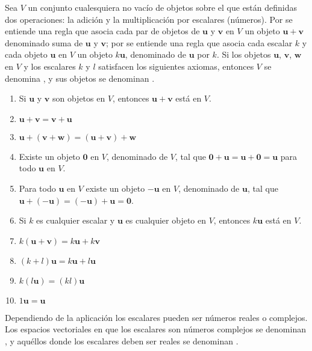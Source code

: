\documentclass[a4paper,12pt]{article}
\begin{document}
\begin{concept}
  Sea $V$ un conjunto cualesquiera no vacío de objetos sobre el que están
  definidas dos operaciones: la adición y la multiplicación por escalares
  (números). Por  se entiende una regla que asocia cada par de
  objetos de $\mathbf{u}$ y $\mathbf{v}$ en $V$ un objeto
  $\mathbf{u}+\mathbf{v}$ denominado suma de $\mathbf{u}$ y $\mathbf{v}$; por
   se entiende una regla que asocia cada escalar
  $k$ y cada objeto $\mathbf{u}$ en $V$ un objeto $k\mathbf{u}$, denominado
   de $\mathbf{u}$ por $k$. Si los objetos $\mathbf{u}$,
  $\mathbf{v}$, $\mathbf{w}$ en $V$ y los escalares $k$ y $l$ satisfacen los
  siguientes axiomas, entonces $V$ se denomina , y sus
  objetos se denominan .
  \begin{enumerate}[(1)]
    \item Si $\mathbf{u}$ y $\mathbf{v}$ son objetos en $V$, entonces
      $\mathbf{u}+\mathbf{v}$ está en $V$.
    \item $\mathbf{u}+\mathbf{v}=\mathbf{v}+\mathbf{u}$
    \item
      $\mathbf{u}+(\mathbf{v}+\mathbf{w})=(\mathbf{u}+\mathbf{v})+\mathbf{w}$
    \item Existe un objeto $\mathbf{0}$ en $V$, denominado  de
      $V$, tal que $\mathbf{0}+\mathbf{u}=\mathbf{u}+\mathbf{0}=\mathbf{u}$
      para todo $\mathbf{u}$ en $V$.
    \item Para todo $\mathbf{u}$ en $V$ existe un objeto $-\mathbf{u}$ en
      $V$, denominado  de $\mathbf{u}$, tal que
      $\mathbf{u}+(-\mathbf{u})=(-\mathbf{u})+\mathbf{u}=\mathbf{0}$.
    \item Si $k$ es cualquier escalar y $\mathbf{u}$ es cualquier objeto en
      $V$, entonces $k\mathbf{u}$ está en $V$.
    \item $k(\mathbf{u}+\mathbf{v})=k\mathbf{u}+k\mathbf{v}$
    \item $(k+l)\mathbf{u}=k\mathbf{u}+l\mathbf{u}$
    \item $k(l\mathbf{u})=(kl)\mathbf{u}$
    \item $1\mathbf{u}=\mathbf{u}$
  \end{enumerate}
\end{concept}

\obse Dependiendo de la aplicación los escalares pueden ser números reales o
complejos. Los espacios vectoriales en que los escalares son números complejos
se denominan , y aquéllos donde los
escalares deben ser reales se denominan .
\end{document}
